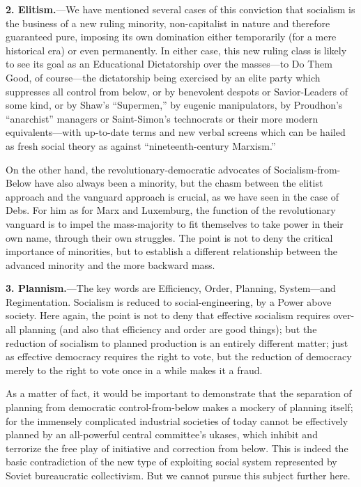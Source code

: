 \textbf{2. Elitism.}---We have mentioned several cases of this conviction that socialism is the business of a new ruling minority, non-capitalist in nature and therefore guaranteed pure, imposing its own domination either temporarily (for a mere historical era) or even permanently. In either case, this new ruling class is likely to see its goal as an Educational Dictatorship over the masses---to Do Them Good, of course---the dictatorship being exercised by an elite party which suppresses all control from below, or by benevolent despots or Savior-Leaders of some kind, or by Shaw's ``Supermen,'' by eugenic manipulators, by Proudhon's ``anarchist'' managers or Saint-Simon's technocrats or their more modern equivalents---with up-to-date terms and new verbal screens which can be hailed as fresh social theory as against ``nineteenth-century Marxism.''

On the other hand, the revolutionary-democratic advocates of Socialism-from-Below have also always been a minority, but the chasm between the elitist approach and the vanguard approach is crucial, as we have seen in the case of Debs. For him as for Marx and Luxemburg, the function of the revolutionary vanguard is to impel the mass-majority to fit themselves to take power in their own name, through their own struggles. The point is not to deny the critical importance of minorities, but to establish a different relationship between the advanced minority and the more backward mass.

\textbf{3. Plannism.}---The key words are Efficiency, Order, Planning, System---and Regimentation. Socialism is reduced to social-engineering, by a Power above society. Here again, the point is not to deny that effective socialism requires over-all planning (and also that efficiency and order are good things); but the reduction of socialism to planned production is an entirely different matter; just as effective democracy requires the right to vote, but the reduction of democracy merely to the right to vote once in a while makes it a fraud.

As a matter of fact, it would be important to demonstrate that the separation of planning from democratic control-from-below makes a mockery of planning itself; for the immensely complicated industrial societies of today cannot be effectively planned by an all-powerful central committee's ukases, which inhibit and terrorize the free play of initiative and correction from below. This is indeed the basic contradiction of the new type of exploiting social system represented by Soviet bureaucratic collectivism. But we cannot pursue this subject further here.

